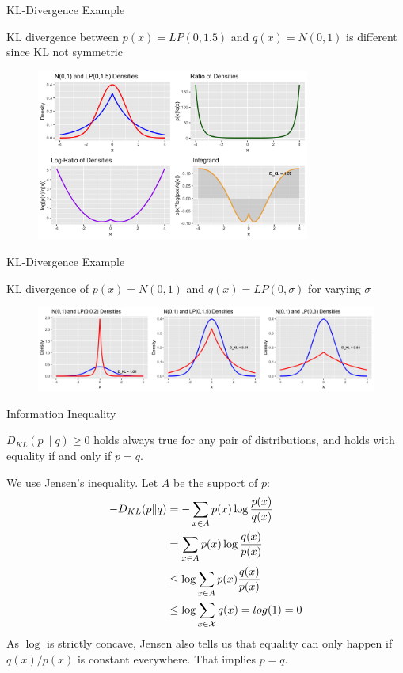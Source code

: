\documentclass[11pt,compress,t,notes=noshow, xcolor=table]{beamer}
\begin{document}
\begin{vbframe} {KL-Divergence Example}

KL divergence between $p(x)=LP(0, 1.5)$ and $q(x)=N(0,1)$ is different since KL not symmetric

\begin{figure}
\includegraphics[width = 9cm ]{figure/kl_calculation_plot_2.png} 
\end{figure}

\end{vbframe}

\begin{vbframe} {KL-Divergence Example}

KL divergence of $p(x)=N(0,1)$ and $q(x)=LP(0, \sigma)$ for varying $\sigma$ \\
\lz
\begin{figure}
\includegraphics[width = 12cm ]{figure/kl_norm_lp.png} 
\end{figure}


\end{vbframe}

\begin{vbframe} {Information Inequality}

$ D_{KL}(p \| q) \geq 0$ holds always true for any pair of distributions, and holds with equality if and only if $p=q$. 

\lz  

We use Jensen's inequality. Let $A$ be the support of $p$:
\begin{equation*}
    \begin{aligned} 
-D_{KL}(p \| q) &= -\sum_{x \in A} p(x) \log \frac{p(x)}{q(x)} \\
                &=  \sum_{x \in A} p(x) \log \frac{q(x)}{p(x)} \\
                &\leq \log \sum_{x \in A} p(x) \frac{q(x)}{p(x)} \\
                &\leq \log \sum_{x \in \mathcal{X}} q(x) = log(1) = 0 
    \end{aligned} 
  \end{equation*}
As $\log$ is strictly concave, Jensen also tells us that equality can only happen if $q(x)/p(x)$ is constant everywhere. That implies $p=q$.
\end{vbframe}
\end{document}
